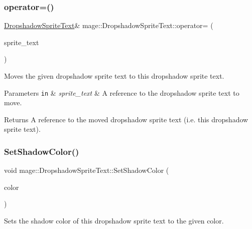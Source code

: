 \subsubsection{\texorpdfstring{operator=()}{operator=()}\hspace{0.1cm}{\footnotesize\ttfamily [2/2]}}
{\footnotesize\ttfamily \hyperlink{classmage_1_1_dropshadow_sprite_text}{Dropshadow\+Sprite\+Text}\& mage\+::\+Dropshadow\+Sprite\+Text\+::operator= (\begin{DoxyParamCaption}\item[{\hyperlink{classmage_1_1_dropshadow_sprite_text}{Dropshadow\+Sprite\+Text} \&\&}]{sprite\+\_\+text }\end{DoxyParamCaption})\hspace{0.3cm}{\ttfamily [delete]}}

Moves the given dropshadow sprite text to this dropshadow sprite text.


\begin{DoxyParams}[1]{Parameters}
\mbox{\tt in}  & {\em sprite\+\_\+text} & A reference to the dropshadow sprite text to move. \\
\hline
\end{DoxyParams}
\begin{DoxyReturn}{Returns}
A reference to the moved dropshadow sprite text (i.\+e. this dropshadow sprite text). 
\end{DoxyReturn}
\hypertarget{classmage_1_1_dropshadow_sprite_text_abefcf9a3bd234df3996950410eefe1bf}{}\label{classmage_1_1_dropshadow_sprite_text_abefcf9a3bd234df3996950410eefe1bf} 
\subsubsection{\texorpdfstring{Set\+Shadow\+Color()}{SetShadowColor()}\hspace{0.1cm}{\footnotesize\ttfamily [1/2]}}
{\footnotesize\ttfamily void mage\+::\+Dropshadow\+Sprite\+Text\+::\+Set\+Shadow\+Color (\begin{DoxyParamCaption}\item[{const \hyperlink{structmage_1_1_color}{Color} \&}]{color }\end{DoxyParamCaption})}

Sets the shadow color of this dropshadow sprite text to the given color.


